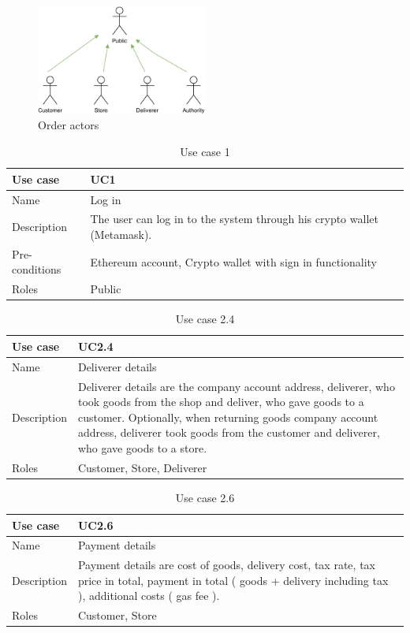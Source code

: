 \documentclass[thesis=M,english]{FITthesis}[2019/12/23]
\begin{document}
\begin{figure}[ht!]
    \centering
    \includegraphics[width=0.5\textwidth]{assets/Actors.pdf}
    \caption{Order actors}
    \label{fig:actors}
\end{figure}


\begin{table}[ht!]
\caption{Use case 1} \label{useCase1}
\begin{tabular}{| p{3cm} | p{10cm}|}
\hline
Use case & UC1    \\\hline
Name     & Log in \\\hline
Description    & The user can log in to the system through his crypto wallet (Metamask). \\\hline
Pre-conditions & Ethereum account, Crypto wallet with sign in functionality              \\\hline
Roles    & Public \\\hline
\end{tabular}
\end{table}

\begin{table}[ht!]
\caption{Use case 2.4} \label{useCase2.4}
\begin{tabular}{| p{3cm} | p{10cm}|}
\hline
Use case & UC2.4    \\\hline
Name     & Deliverer details \\\hline
Description    & Deliverer details are the company account address, deliverer, who took goods from the shop and deliver, who gave goods to a customer. Optionally, when returning goods company account address, deliverer took goods from the customer and deliverer, who gave goods to a store.  \\\hline
Roles    & Customer, Store, Deliverer \\\hline
\end{tabular}
\end{table}

\begin{table}[ht!]
\caption{Use case 2.6} \label{useCase2.6}
\begin{tabular}{| p{3cm} | p{10cm}|}
\hline
Use case & UC2.6    \\\hline
Name     & Payment details \\\hline
Description    & Payment details  are cost of goods, delivery cost, tax rate, tax price in total, payment in total ( goods + delivery including tax ), additional costs ( gas fee ).  \\\hline
Roles    & Customer, Store \\\hline
\end{tabular}
\end{table}
\end{document}
